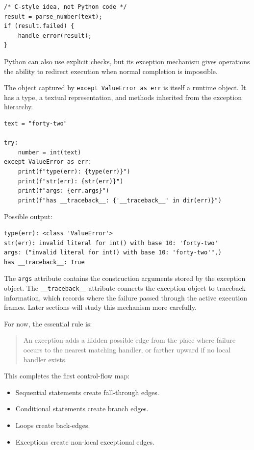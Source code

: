 \documentclass[a4paper,twoside]{report}
\begin{document}
\begin{verbatim}
/* C-style idea, not Python code */
result = parse_number(text);
if (result.failed) {
    handle_error(result);
}
\end{verbatim}

Python can also use explicit checks, but its exception mechanism gives operations the ability to redirect execution when normal completion is impossible.

The object captured by \texttt{except ValueError as err} is itself a runtime object. It has a type, a textual representation, and methods inherited from the exception hierarchy.

\begin{verbatim}
text = "forty-two"

try:
    number = int(text)
except ValueError as err:
    print(f"type(err): {type(err)}")
    print(f"str(err): {str(err)}")
    print(f"args: {err.args}")
    print(f"has __traceback__: {'__traceback__' in dir(err)}")
\end{verbatim}

Possible output:

\begin{verbatim}
type(err): <class 'ValueError'>
str(err): invalid literal for int() with base 10: 'forty-two'
args: ("invalid literal for int() with base 10: 'forty-two'",)
has __traceback__: True
\end{verbatim}

The \texttt{args} attribute contains the construction arguments stored by the exception object. The \texttt{\_\_traceback\_\_} attribute connects the exception object to traceback information, which records where the failure passed through the active execution frames. Later sections will study this mechanism more carefully.

For now, the essential rule is:

\begin{quote}
An exception adds a hidden possible edge from the place where failure occurs to the nearest matching handler, or farther upward if no local handler exists.
\end{quote}

This completes the first control-flow map:

\begin{itemize}
    \item Sequential statements create fall-through edges.
    \item Conditional statements create branch edges.
    \item Loops create back-edges.
    \item Exceptions create non-local exceptional edges.
\end{itemize}
\end{document}

